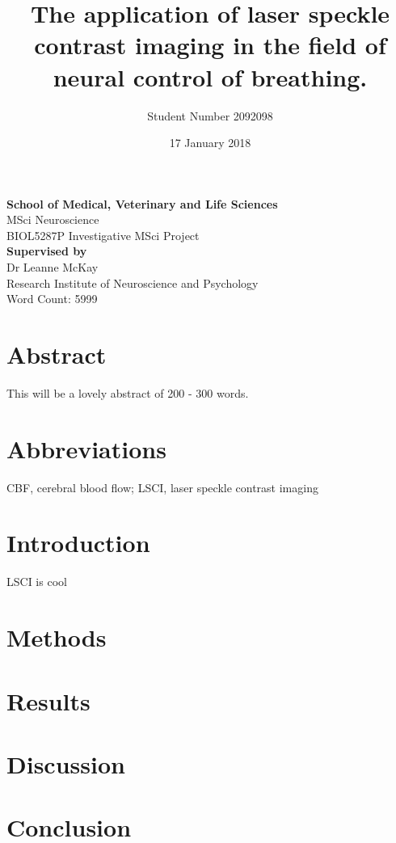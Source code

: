 \documentclass[12pt,a4paper]{article}
\newcommand{\titlepicture}[2][]{%
  \renewcommand\placetitlepicture{%
    \texttt{[image: \#2]}\par\medskip
  }%
}
\newcommand{\placetitlepicture}{} %
\begin{document}
\begin{titlepage}
\titlepicture[scale=0.7]{uog_logo}
\title{The application of laser speckle contrast imaging in the field of neural control of breathing.}
\author{Student Number 2092098}
\date{17 January 2018}
\maketitle
\thispagestyle{empty}
\begin{center}
\textbf{School of Medical, Veterinary and Life Sciences}\\
MSci Neuroscience\\
BIOL5287P Investigative MSci Project\\
\vspace{5mm}
\textbf{Supervised by}\\
Dr Leanne McKay\\
Research Institute of Neuroscience and Psychology\\
\vspace{5mm}
Word Count: 5999
\end{center}
\end{titlepage}
\newpage 
\tableofcontents
\hspace{20mm}
\section*{Abstract}
This will be a lovely abstract of 200 - 300 words.
\section*{Abbreviations}
CBF, cerebral blood flow; LSCI, laser speckle contrast imaging
\section{Introduction}
LSCI is cool \cite{Ayata}
\section{Methods}
\section{Results}
\section{Discussion}
\section{Conclusion}

\end{document}
